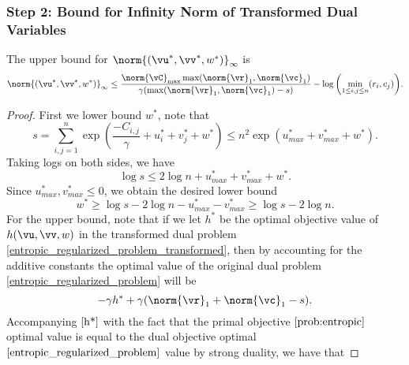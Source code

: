\subsubsection{Step 2: Bound for Infinity Norm of Transformed Dual Variables}
\label{step 2}
\begin{lemma}
    \label{lem:inf_norm_dual}
    The upper bound for $\norm{(\vu^\ast,\vv^\ast,w^\ast)}_\infty$ is
    \begin{align*}
        \norm{(\vu^\ast,\vv^\ast, w^\ast)}_\infty \leq \frac{\norm{\vC}_{\max} \max(\norm{\vr}_1, \norm{\vc}_1)}{\gamma (\max(\norm{\vr}_1, \norm{\vc}_1)-s)} - \log{ \left( \min_{1 \leq i,j \leq n} (r_i, c_j) \right)}.
    \end{align*}
\end{lemma}
\begin{proof} 
    First we lower bound $w^\ast$, note that 
    \begin{equation*}
        s = \sum_{i,j = 1}^{n} \exp \left(\frac{- C_{i, j}}{\gamma} + u^\ast_i + v^\ast_j + w^\ast \right) \leq n^2 \exp \left( u^\ast_{max} + v^\ast_{max} + w^\ast \right).
    \end{equation*}
    Taking logs on both sides, we have
    \begin{equation*} 
        \log{s} \leq 2\log{n} + u^\ast_{max} + v^\ast_{max} + w^\ast.
    \end{equation*}
    Since $u^\ast_{max}, v^\ast_{max} \leq 0$, we obtain the desired lower bound
    \begin{equation*}
        w^\ast \geq \log{s} - 2\log{n} - u^\ast_{max} - v^\ast_{max} \geq \log{s} - 2\log{n}.
    \end{equation*}
    For the upper bound, note that if we let $h^\ast$ be the optimal objective value of $h(\vu,\vv,w)$ in the transformed dual problem \eqref{entropic_regularized_problem_transformed}, then by accounting for the additive constants the optimal value of the original dual problem \eqref{entropic_regularized_problem} will be 
    \begin{equation} \label{h*}
        - \gamma h^\ast + \gamma (\norm{\vr}_1 + \norm{\vc}_1 - s).
    \end{equation}
    Accompanying $\eqref{h*}$ with the fact that the primal objective $\eqref{prob:entropic}$ optimal value is equal to the dual objective optimal $\eqref{entropic_regularized_problem}$ value by strong duality, we have that

\end{proof}
